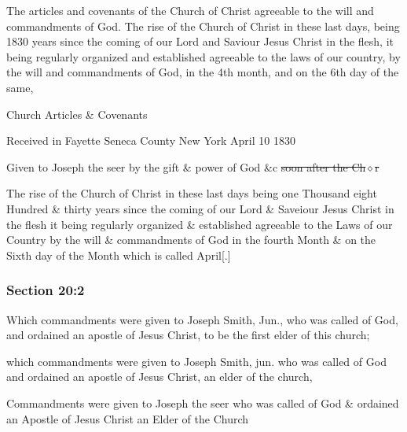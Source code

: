 		\begin{framed}
		\scriptsize
			\begin{compactdesc}
				\item[JSP] The articles and covenants of the Church of Christ agreeable to the will and commandments of God. The rise of the Church of Christ in these last days, being 1830 years since the coming of our Lord and Saviour Jesus Christ in the flesh, it being regularly organized and established agreeable to the laws of our country, by the will and commandments of God, in the 4th month, and on the 6th day of the same,
				\item[RB1] Church Articles \& Covenants

							Received in Fayette Seneca County New York April 10 1830

							Given to Joseph the seer by the gift \& power of God \&c \sout{soon after the Ch$\diamond$r}
							
							The rise of the Church of Christ in these last days being one Thousand eight Hundred \& thirty years since the coming of our Lord \& Saveiour Jesus Christ in the flesh it being regularly organized \& established agreeable to the Laws of our Country by the will \& commandments of God in the fourth Month \& on the Sixth day of the Month which is called April[.]
			\end{compactdesc}
		\end{framed}

	\subsubsection{Section 20:2} %
		\label{DC20-2}

		Which commandments were given to Joseph Smith, Jun., who was called of God, and ordained an apostle of Jesus Christ, to be the first elder of this church;

		\begin{framed}
		\scriptsize
			\begin{compactdesc}
				\item[JSP] which commandments were given to Joseph Smith, jun. who was called of God and ordained an apostle of Jesus Christ, an elder of the church,
				\item[RB1] Commandments were given to Joseph the seer who was called of God \& ordained an Apostle of Jesus Christ an Elder of the Church
			\end{compactdesc}
		\end{framed}

